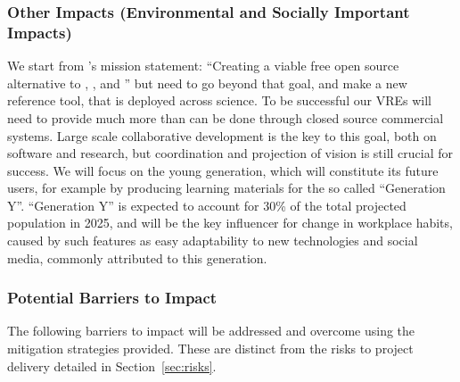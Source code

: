 \subsubsection{Other Impacts (Environmental and Socially Important Impacts)}


We start from \Sage's mission statement: ``Creating a viable free open
source alternative to \Magma, \Maple, \Mathematica and \Matlab'' but
need to go beyond that goal, and make \TheProject a new reference
tool, that is deployed across science. To be successful our VREs will
need to provide much more than can be done through closed source
commercial systems. Large scale collaborative development is the key
to this goal, both on software and research, but coordination and
projection of vision is still crucial for success. We will focus on
the young generation, which will constitute its future users, for
example by producing learning materials for the so called ``Generation
Y''. ``Generation Y'' is expected to account for 30\% of the total
projected population in 2025, and will be the key influencer for
change in workplace habits, caused by such features as easy
adaptability to new technologies and social media, commonly attributed
to this generation.  


\subsubsection{Potential Barriers to Impact}

The following barriers to impact will be addressed and overcome using the mitigation
strategies provided. These are distinct from the risks to project delivery
detailed in Section~\ref{sec:risks}.
